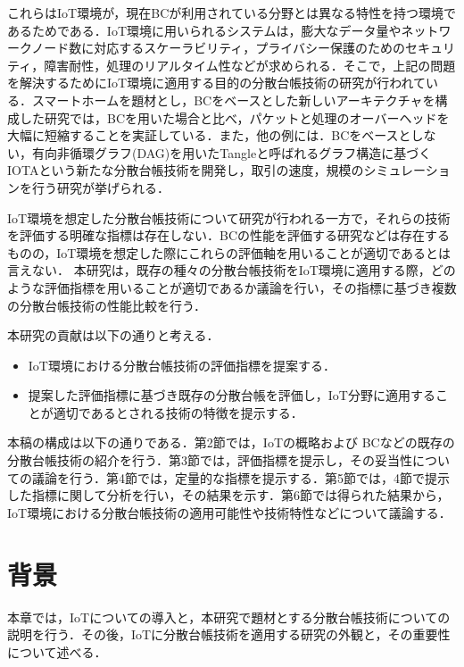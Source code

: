 \documentclass[japanese, macos]{KU2}
\begin{document}
これらはIoT環境が，現在BCが利用されている分野とは異なる特性を持つ環境であるためである．IoT環境に用いられるシステムは，膨大なデータ量やネットワークノード数に対応するスケーラビリティ，プライバシー保護のためのセキュリティ，障害耐性，処理のリアルタイム性などが求められる．そこで，上記の問題を解決するためにIoT環境に適用する目的の分散台帳技術の研究が行われている．スマートホームを題材とし，BCをベースとした新しいアーキテクチャを構成した研究\cite{dorri2017towards}では，BCを用いた場合と比べ，パケットと処理のオーバーヘッドを大幅に短縮することを実証している．また，他の例には．BCをベースとしない，有向非循環グラフ(DAG)を用いたTangleと呼ばれるグラフ構造に基づくIOTAという新たな分散台帳技術を開発し，取引の速度，規模のシミュレーションを行う研究\cite{popov2016tangle}\cite{kusmierz2017first}が挙げられる．

IoT環境を想定した分散台帳技術について研究が行われる一方で，それらの技術を評価する明確な指標は存在しない．BCの性能を評価する研究\cite{croman2016scaling}などは存在するものの，IoT環境を想定した際にこれらの評価軸を用いることが適切であるとは言えない．
本研究は，既存の種々の分散台帳技術をIoT環境に適用する際，どのような評価指標を用いることが適切であるか議論を行い，その指標に基づき複数の分散台帳技術の性能比較を行う．

本研究の貢献は以下の通りと考える．
\begin{itemize}
\item IoT環境における分散台帳技術の評価指標を提案する．\\
\item 提案した評価指標に基づき既存の分散台帳を評価し，IoT分野に適用することが適切であるとされる技術の特徴を提示する．\\
\end{itemize}
本稿の構成は以下の通りである．第2節では，IoTの概略および BCなどの既存の分散台帳技術の紹介を行う．第3節では，評価指標を提示し，その妥当性についての議論を行う．第4節では，定量的な指標を提示する．第5節では，4節で提示した指標に関して分析を行い，その結果を示す．第6節では得られた結果から，IoT環境における分散台帳技術の適用可能性や技術特性などについて議論する．

\chapter{背景}
本章では，IoTについての導入と，本研究で題材とする分散台帳技術についての説明を行う．その後，IoTに分散台帳技術を適用する研究の外観と，その重要性について述べる．
\end{document}
